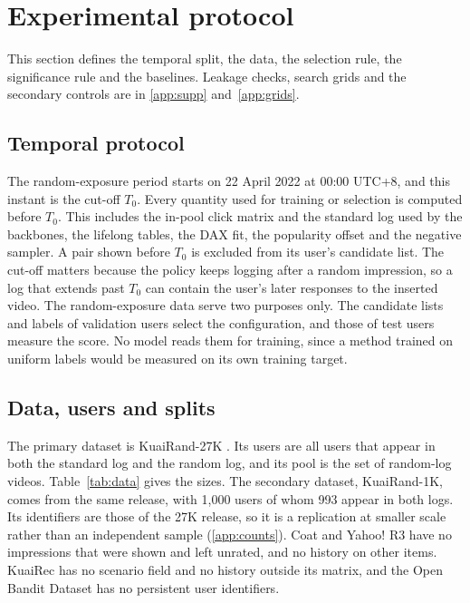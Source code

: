 \documentclass[preprint,12pt,authoryear]{elsarticle}
\begin{document}
\section{Experimental protocol}
\label{sec:protocol}

This section defines the temporal split, the data, the selection rule, the significance rule and the baselines. Leakage checks,
search grids and the secondary controls are in \ref{app:supp} and~\ref{app:grids}.

\subsection{Temporal protocol}
\label{sec:protocol-temporal}

The random-exposure period starts on 22 April 2022 at 00:00 UTC+8, and this instant is the cut-off $T_0$. Every quantity used for training
or selection is computed before $T_0$. This includes the in-pool click matrix and the standard log used by the backbones, the lifelong
tables, the DAX fit, the popularity offset and the negative sampler. A pair shown before $T_0$ is excluded from its user's candidate list.
The cut-off matters because the policy keeps logging after a random impression, so a log that extends past $T_0$ can contain the user's
later responses to the inserted video. The random-exposure data serve two purposes only. The candidate lists and labels of validation users
select the configuration, and those of test users measure the score. No model reads them for training, since a method trained on uniform
labels would be measured on its own training target.

\subsection{Data, users and splits}
\label{sec:protocol-data}

The primary dataset is KuaiRand-27K \citep{gao2022kuairand}. Its users are all users that appear in both the standard log and the random log,
and its pool is the set of random-log videos. Table~\ref{tab:data} gives the sizes. The secondary dataset, KuaiRand-1K, comes from the same
release, with 1,000 users of whom 993 appear in both logs. Its identifiers are those of the 27K release, so it is a replication at smaller
scale rather than an independent sample (\ref{app:counts}). Coat \citep{schnabel2016} and Yahoo! R3 \citep{marlin2009collaborative} have no impressions that were shown and left unrated, and no history on other items. KuaiRec \citep{gao2022kuairec} has no scenario field and no history outside its matrix, and the Open Bandit Dataset \citep{saito2021obd} has no persistent user identifiers.
\end{document}
